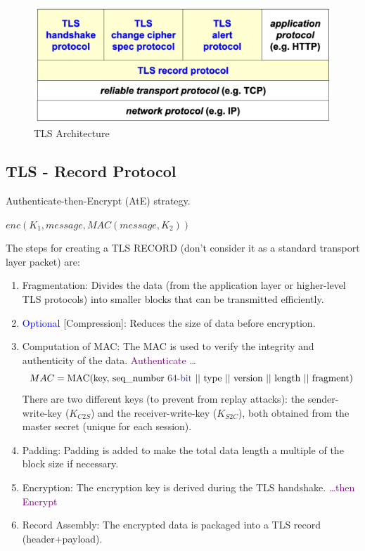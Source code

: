 \begin{figure}[H]
    \centering
    \includegraphics[width=0.5\linewidth]{Images/Appsec/tls_arch.png}
    \caption{TLS Architecture}
\end{figure}

\subsection{TLS - Record Protocol}
\begin{center}
    Authenticate-then-Encrypt (AtE) strategy.

    $enc(K_1, message, MAC(message, K_2))$
\end{center}
The steps for creating a TLS RECORD (don't consider it as a standard transport layer packet) are:

\begin{enumerate}
    \item Fragmentation: Divides the data (from the application layer or higher-level TLS protocols) into smaller blocks that can be transmitted efficiently.
    \item \textcolor{blue}{Optional} [Compression]: Reduces the size of data before encryption.
    \item Computation of MAC: The MAC is used to verify the integrity and authenticity of the data. \textcolor{Purple}{Authenticate \dots}
    \[
        MAC=\text{MAC(key, seq\_number \textcolor{Blue}{64-bit} || type || version || length || fragment)}
    \]
    There are two different keys (to prevent from replay attacks): the sender-write-key ($K_{C2S}$) and the receiver-write-key ($K_{S2C}$), both obtained from the master secret (unique for each session).

    \item Padding: Padding is added to make the total data length a multiple of the block size if necessary.
    \item Encryption: The encryption key is derived during the TLS handshake. \textcolor{Purple}{\dots then Encrypt}
    \item Record Assembly: The encrypted data is packaged into a TLS record (header+payload).
\end{enumerate}


